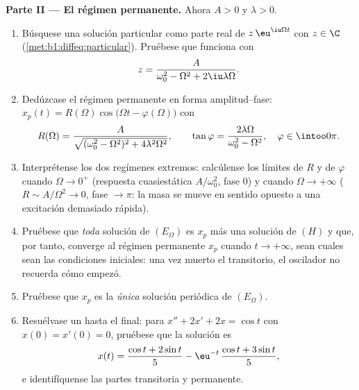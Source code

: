 \begin{problem}
\medskip
\noindent\textbf{Parte II --- El régimen permanente.} Ahora $A > 0$ y
$\lambda > 0$.
\begin{enumerate}[resume]
  \item Búsquese una solución particular como parte real de
        $z\,\eu^{\iu\Omega t}$ con $z \in \C$
        (\cref{met:b1:diffeq:particular}). Pruébese que funciona con
        \[
        z = \frac{A}{\omega_0^2 - \Omega^2 + 2\iu\lambda\Omega} .
        \]
  \item Dedúzcase el régimen permanente en forma amplitud--fase:
        $x_p(t) = R(\Omega)\cos\bigl(\Omega t -
        \varphi(\Omega)\bigr)$ con
        \[
        R(\Omega) = \frac{A}{\sqrt{(\omega_0^2 - \Omega^2)^2 +
        4\lambda^2\Omega^2}},
        \qquad
        \tan\varphi = \frac{2\lambda\Omega}{\omega_0^2 -
        \Omega^2},
        \quad \varphi \in \intoo0\pi .
        \]
  \item Interprétense los dos regímenes extremos: calcúlense los
        límites de $R$ y de $\varphi$ cuando $\Omega \to 0^+$
        (respuesta cuasiestática $A/\omega_0^2$, fase $0$) y cuando
        $\Omega \to +\infty$ ($R \sim A/\Omega^2 \to 0$, fase
        $\to \pi$: la masa se mueve en sentido opuesto a una excitación
        demasiado rápida).
  \item Pruébese que \emph{toda} solución de $(E_\Omega)$ es $x_p$ más
        una solución de $(H)$ y que, por tanto, converge al régimen
        permanente $x_p$ cuando $t \to +\infty$, sean cuales sean las
        condiciones iniciales: una vez muerto el transitorio, el
        oscilador no recuerda cómo empezó.
  \item Pruébese que $x_p$ es la \emph{única} solución periódica de
        $(E_\Omega)$.
  \item Resuélvase un  hasta el final: para
        $x'' + 2x' + 2x = \cos t$ con $x(0) = x'(0) = 0$, pruébese que
        la solución es
        \[
        x(t) = \frac{\cos t + 2\sin t}5
        - \eu^{-t}\,\frac{\cos t + 3\sin t}5 ,
        \]
        e identifíquense las partes transitoria y permanente.
\end{enumerate}


\end{problem}
